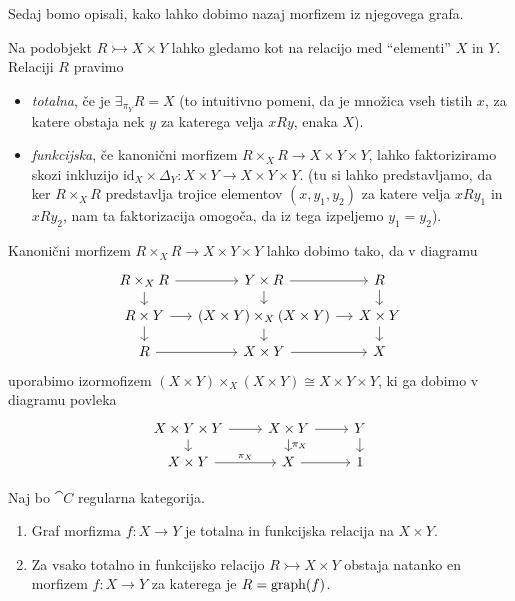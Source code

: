 \documentclass[../kategoricna_logika.tex]{subfiles}
\begin{document}
\noindent
Sedaj bomo opisali, kako lahko dobimo nazaj morfizem iz njegovega grafa.
\begin{definicija}
  Na podobjekt $R \rightarrowtail X \times Y$ lahko gledamo kot na relacijo med ``elementi'' $X$ in $Y$. Relaciji $R$ pravimo 
  \begin{itemize}
    \item \emph{totalna}, če je $\exists_{\pi_Y}R = X$ (to intuitivno pomeni, da je množica vseh tistih $x$, za katere obstaja nek $y$ za katerega velja $xRy$, enaka $X$).
    \item \emph{funkcijska}, če kanonični morfizem $R \times_X R \to X \times Y \times Y$, lahko faktoriziramo skozi inkluzijo $\mathrm{id}_X \times \Delta_Y : X \times Y \to X \times Y \times Y$. (tu si lahko predstavljamo, da ker $R \times_X R$ predstavlja trojice elementov $(x, y_1, y_2)$ za katere velja $xRy_1$ in $xRy_2$, nam ta faktorizacija omogoča, da iz tega izpeljemo $y_1 = y_2$).
  \end{itemize}
\end{definicija}
\begin{opomba}
  Kanonični morfizem $R \times_X R \to X \times Y \times Y$ lahko dobimo tako, da v diagramu
  \begin{equation*}
  \begin{tikzcd}[row sep=small, column sep=small]
    R \times_X R \ar[d] \ar[r] & Y \times R \ar[d] \ar[r] & R \ar[d] \\
    R \times Y \ar[d] \ar[r] & (X \times Y) \times_X (X \times Y) \ar[d] \ar[r] & X \times Y \ar[d] \\
    R \ar[r] & X \times Y \ar[r] & X
  \end{tikzcd}
  \end{equation*}
  uporabimo izormofizem $(X \times Y) \times_X (X \times Y) \cong X \times Y \times Y$, ki ga dobimo v diagramu povleka
  \begin{equation*}
  \begin{tikzcd}[row sep=small, column sep=normal]
    X \times Y  \times Y\ar[d] \ar[r] & X \times Y \ar[d, "\pi_X"] \ar[r] & Y \ar[d] \\
    X \times Y \ar[r, "\pi_X"] & X \ar[r] & 1
  \end{tikzcd}
  \end{equation*}
\end{opomba}
\begin{lema}
  Naj bo $\cat{C}$ regularna kategorija.
  \begin{enumerate}[label=(\roman*)]
    \item Graf morfizma $f : X \to Y$ je totalna in funkcijska relacija na $X \times Y$.
    \item Za vsako totalno in funkcijsko relacijo $R \rightarrowtail X \times Y$ obstaja natanko en morfizem $f : X \to Y$ za katerega je $R = \operatorname{graph}(f)$.
  \end{enumerate}
\end{lema}
\end{document}
